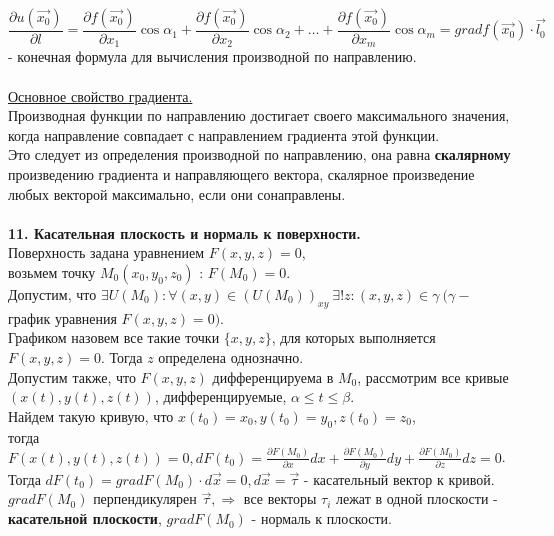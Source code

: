 \documentclass[12pt]{article}
\begin{document}
$$\frac{\partial u (\overrightarrow{x_0})}{\partial l} = \frac{\partial f(\overrightarrow{x_0})}{\partial x_1} \cos{\alpha_1} + \frac{\partial f(\overrightarrow{x_0})}{\partial x_2} \cos{\alpha_2} + \dots + \frac{\partial f(\overrightarrow{x_0})}{\partial x_m} \cos{\alpha_m} = gradf(\overrightarrow{x_0}) \cdot \overrightarrow{l_0}$$ - конечная формула для вычисления производной по направлению.\\
\\
\label{question10_3}\underline{Основное свойство градиента.}\\
Производная функции по направлению достигает своего максимального значения, когда направление совпадает с направлением градиента этой функции.\\
Это следует из определения производной по направлению, она равна \textbf{скалярному} произведению градиента и направляющего вектора, скалярное произведение любых векторой максимально, если они сонаправлены.\\
\\
\label{question11}\textbf{11. Касательная плоскость и нормаль к поверхности.}\\
Поверхность задана уравнением $F(x,y,z) = 0$, \\возьмем точку $M_0(x_0,y_0,z_0)$ : $F(M_0) = 0$.\\
Допустим, что $\exists U(M_0) : \forall (x,y) \in (U(M_0))_{xy} \ \exists!{z} : (x,y,z) \in \gamma \ (\gamma -$ график уравнения $F(x,y,z) = 0)$.\\
Графиком назовем все такие точки $\{x,y,z\}$, для которых выполняется $F(x,y,z) = 0$. Тогда $z$ определена однозначно.\\
Допустим также, что $F(x,y,z)$ дифференцируема в $M_0$, рассмотрим все кривые $(x(t),y(t),z(t))$, дифференцируемые, $\alpha \leq t \leq \beta$.\\
Найдем такую кривую, что $x(t_0) = x_0, y(t_0) = y_0, z(t_0) = z_0$, \\
тогда $F(x(t), y(t), z(t)) = 0, dF(t_0) = \frac{\partial F(M_0)}{\partial x}dx+\frac{\partial F(M_0)}{\partial y}dy+\frac{\partial F(M_0)}{\partial z}dz = 0$.\\
Тогда $dF(t_0) = gradF(M_0) \cdot d\overrightarrow{x} = 0, d\overrightarrow{x} = \overrightarrow{\tau}$ - касательный вектор к кривой.\\
$gradF(M_0)$ перпендикулярен $\overrightarrow{\tau}, \Rightarrow$ все векторы $\tau_i$ лежат в одной плоскости - \textbf{касательной плоскости}, $gradF(M_0)$ - нормаль к плоскости.\\
\end{document}
